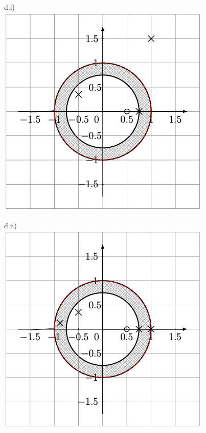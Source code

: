 \documentclass[11pt]{article}
\begin{document}
\noindent
\begin{minipage}[t]{0.25\textwidth}
    d.i)\\
    \includegraphics[width=\linewidth]{docimgs/di.png}
\end{minipage}
\hfill
\begin{minipage}[t]{0.25\textwidth}
    d.ii)\\
    \includegraphics[width=\linewidth]{docimgs/dii.png}
\end{minipage}
\end{document}

